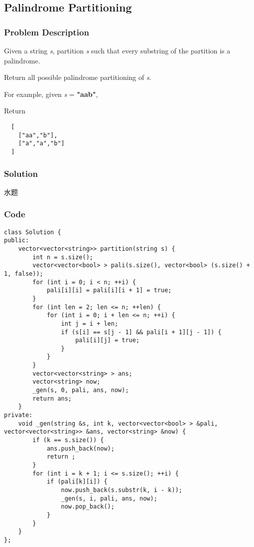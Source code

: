 \documentclass[courier]{article}
\begin{document}
\begin{CJK*}{UTF8}{gkai}
\subsection{ Palindrome Partitioning }

\subsubsection*{Problem Description}
Given a string \emph{s}, partition \emph{s} such that every substring of the partition is a palindrome.

Return all possible palindrome partitioning of \emph{s}.

For example, given \emph{s} = \textbf{"aab"},



Return
\begin{verbatim}
  [
    ["aa","b"],
    ["a","a","b"]
  ]
\end{verbatim}



\subsubsection*{Solution}
水题

\subsubsection*{Code}
\begin{lstlisting}
class Solution {
public:
    vector<vector<string>> partition(string s) {
        int n = s.size();
        vector<vector<bool> > pali(s.size(), vector<bool> (s.size() + 1, false));
        for (int i = 0; i < n; ++i) {
            pali[i][i] = pali[i][i + 1] = true;
        }
        for (int len = 2; len <= n; ++len) {
            for (int i = 0; i + len <= n; ++i) {
                int j = i + len;
                if (s[i] == s[j - 1] && pali[i + 1][j - 1]) {
                    pali[i][j] = true;
                }
            }
        }
        vector<vector<string> > ans;
        vector<string> now;
        _gen(s, 0, pali, ans, now);
        return ans;
    }
private:
    void _gen(string &s, int k, vector<vector<bool> > &pali, vector<vector<string>> &ans, vector<string> &now) {
        if (k == s.size()) {
            ans.push_back(now);
            return ;
        }
        for (int i = k + 1; i <= s.size(); ++i) {
            if (pali[k][i]) {
                now.push_back(s.substr(k, i - k));
                _gen(s, i, pali, ans, now);
                now.pop_back();
            }
        }
    }
}; 
\end{lstlisting}



\end{CJK*}
\end{document}
